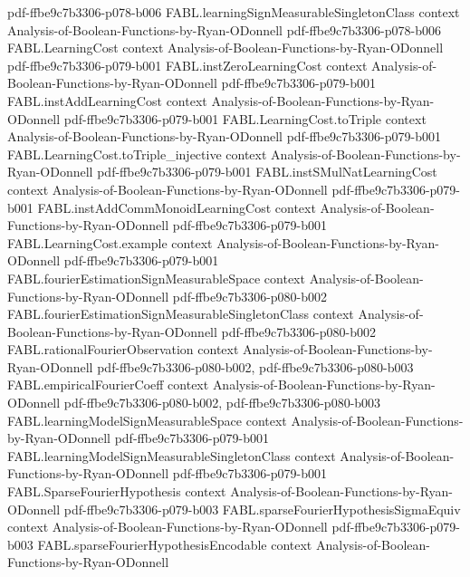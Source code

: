 \begin{theorem}
  {pdf-ffbe9c7b3306-p078-b006}
\proofstep
  {FABL.learningSignMeasurableSingletonClass}
  {context}
  {Analysis-of-Boolean-Functions-by-Ryan-ODonnell}
  {pdf-ffbe9c7b3306-p078-b006}
\proofstep
  {FABL.LearningCost}
  {context}
  {Analysis-of-Boolean-Functions-by-Ryan-ODonnell}
  {pdf-ffbe9c7b3306-p079-b001}
\proofstep
  {FABL.instZeroLearningCost}
  {context}
  {Analysis-of-Boolean-Functions-by-Ryan-ODonnell}
  {pdf-ffbe9c7b3306-p079-b001}
\proofstep
  {FABL.instAddLearningCost}
  {context}
  {Analysis-of-Boolean-Functions-by-Ryan-ODonnell}
  {pdf-ffbe9c7b3306-p079-b001}
\proofstep
  {FABL.LearningCost.toTriple}
  {context}
  {Analysis-of-Boolean-Functions-by-Ryan-ODonnell}
  {pdf-ffbe9c7b3306-p079-b001}
\proofstep
  {FABL.LearningCost.toTriple_injective}
  {context}
  {Analysis-of-Boolean-Functions-by-Ryan-ODonnell}
  {pdf-ffbe9c7b3306-p079-b001}
\proofstep
  {FABL.instSMulNatLearningCost}
  {context}
  {Analysis-of-Boolean-Functions-by-Ryan-ODonnell}
  {pdf-ffbe9c7b3306-p079-b001}
\proofstep
  {FABL.instAddCommMonoidLearningCost}
  {context}
  {Analysis-of-Boolean-Functions-by-Ryan-ODonnell}
  {pdf-ffbe9c7b3306-p079-b001}
\proofstep
  {FABL.LearningCost.example}
  {context}
  {Analysis-of-Boolean-Functions-by-Ryan-ODonnell}
  {pdf-ffbe9c7b3306-p079-b001}
\proofstep
  {FABL.fourierEstimationSignMeasurableSpace}
  {context}
  {Analysis-of-Boolean-Functions-by-Ryan-ODonnell}
  {pdf-ffbe9c7b3306-p080-b002}
\proofstep
  {FABL.fourierEstimationSignMeasurableSingletonClass}
  {context}
  {Analysis-of-Boolean-Functions-by-Ryan-ODonnell}
  {pdf-ffbe9c7b3306-p080-b002}
\proofstep
  {FABL.rationalFourierObservation}
  {context}
  {Analysis-of-Boolean-Functions-by-Ryan-ODonnell}
  {pdf-ffbe9c7b3306-p080-b002,
    pdf-ffbe9c7b3306-p080-b003}
\proofstep
  {FABL.empiricalFourierCoeff}
  {context}
  {Analysis-of-Boolean-Functions-by-Ryan-ODonnell}
  {pdf-ffbe9c7b3306-p080-b002,
    pdf-ffbe9c7b3306-p080-b003}
\proofstep
  {FABL.learningModelSignMeasurableSpace}
  {context}
  {Analysis-of-Boolean-Functions-by-Ryan-ODonnell}
  {pdf-ffbe9c7b3306-p079-b001}
\proofstep
  {FABL.learningModelSignMeasurableSingletonClass}
  {context}
  {Analysis-of-Boolean-Functions-by-Ryan-ODonnell}
  {pdf-ffbe9c7b3306-p079-b001}
\proofstep
  {FABL.SparseFourierHypothesis}
  {context}
  {Analysis-of-Boolean-Functions-by-Ryan-ODonnell}
  {pdf-ffbe9c7b3306-p079-b003}
\proofstep
  {FABL.sparseFourierHypothesisSigmaEquiv}
  {context}
  {Analysis-of-Boolean-Functions-by-Ryan-ODonnell}
  {pdf-ffbe9c7b3306-p079-b003}
\proofstep
  {FABL.sparseFourierHypothesisEncodable}
  {context}
  {Analysis-of-Boolean-Functions-by-Ryan-ODonnell}

\end{theorem}
